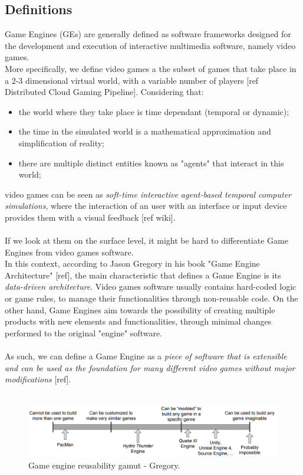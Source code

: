 \subsection{Definitions}
Game Engines (GEs) are generally defined as software frameworks designed for the development and execution of interactive multimedia software, namely video games. \\
More specifically, we define video games a the subset of games that take place in a 2-3 dimensional virtual world, with a variable number of players [ref Distributed Cloud Gaming Pipeline]. Considering that:
\begin{itemize}
	\item the world where they take place is time dependant (temporal or dynamic);
	\item the time in the simulated world is a mathematical approximation and simplification of reality;
	\item there are multiple distinct entities known as "agents" that interact in this world;
\end{itemize}
video games can be seen as \textit{soft-time interactive agent-based temporal computer simulations}, where the interaction of an user with an interface or input device provides them with a visual feedback [ref wiki]. \\ \\
If we look at them on the surface level, it might be hard to differentiate Game Engines from video games software. \\
In this context, according to Jason Gregory in his book "Game Engine Architecture" [ref], the main characteristic that defines a Game Engine is its \textit{data-driven architecture}.
Video games software usually contains hard-coded logic or game rules, to manage their functionalities through non-reusable code. On the other hand, Game Engines aim towards the possibility of creating multiple products with new elements and functionalities, through minimal changes performed to the original "engine" software. \\ \\
As such, we can define a Game Engine as a \textit{piece of software that is extensible and can be used as the foundation for many different video games without major modifications} [ref]. \\ \\
\begin{figure}
	\centering
	\includegraphics[width=1\linewidth]{"immagini/State-of-the-art/Reusability gamut"}
	\caption[Game engine reusability gamut - Gregory]{Game engine reusability gamut - Gregory.}
	\label{fig:reusability-gamut}
\end{figure}

